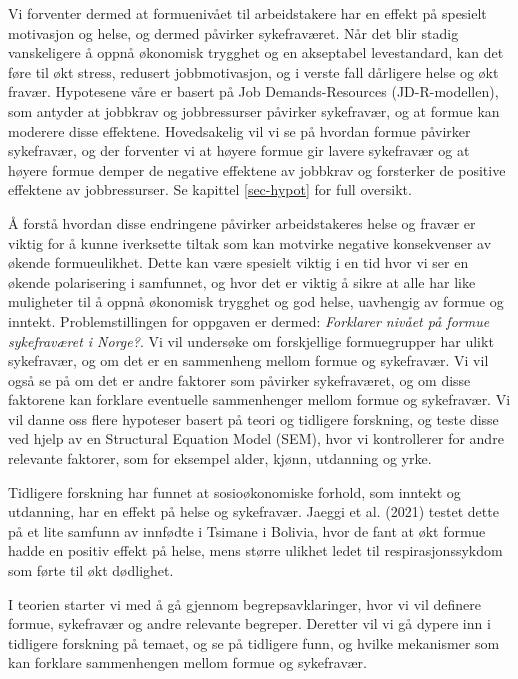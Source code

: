 \documentclass[
  12pt,
  a4paper,
  DIV=11,
  numbers=noendperiod]{scrartcl}
\begin{document}
Vi forventer dermed at formuenivået til arbeidstakere har en effekt på
spesielt motivasjon og helse, og dermed påvirker sykefraværet. Når det
blir stadig vanskeligere å oppnå økonomisk trygghet og en akseptabel
levestandard, kan det føre til økt stress, redusert jobbmotivasjon, og i
verste fall dårligere helse og økt fravær. Hypotesene våre er basert på
Job Demands-Resources (JD-R-modellen), som antyder at jobbkrav og
jobbressurser påvirker sykefravær, og at formue kan moderere disse
effektene. Hovedsakelig vil vi se på hvordan formue påvirker sykefravær,
og der forventer vi at høyere formue gir lavere sykefravær og at høyere
formue demper de negative effektene av jobbkrav og forsterker de
positive effektene av jobbressurser. Se kapittel \ref{sec-hypot} for
full oversikt.

Å forstå hvordan disse endringene påvirker arbeidstakeres helse og
fravær er viktig for å kunne iverksette tiltak som kan motvirke negative
konsekvenser av økende formueulikhet. Dette kan være spesielt viktig i
en tid hvor vi ser en økende polarisering i samfunnet, og hvor det er
viktig å sikre at alle har like muligheter til å oppnå økonomisk
trygghet og god helse, uavhengig av formue og inntekt. Problemstillingen
for oppgaven er dermed: \emph{Forklarer nivået på formue sykefraværet i
Norge?}. Vi vil undersøke om forskjellige formuegrupper har ulikt
sykefravær, og om det er en sammenheng mellom formue og sykefravær. Vi
vil også se på om det er andre faktorer som påvirker sykefraværet, og om
disse faktorene kan forklare eventuelle sammenhenger mellom formue og
sykefravær. Vi vil danne oss flere hypoteser basert på teori og
tidligere forskning, og teste disse ved hjelp av en Structural Equation
Model (SEM), hvor vi kontrollerer for andre relevante faktorer, som for
eksempel alder, kjønn, utdanning og yrke.

Tidligere forskning har funnet at sosioøkonomiske forhold, som inntekt
og utdanning, har en effekt på helse og sykefravær. Jaeggi et al. (2021)
testet dette på et lite samfunn av innfødte i Tsimane i Bolivia, hvor de
fant at økt formue hadde en positiv effekt på helse, mens større ulikhet
ledet til respirasjonssykdom som førte til økt dødlighet.

I teorien starter vi med å gå gjennom begrepsavklaringer, hvor vi vil
definere formue, sykefravær og andre relevante begreper. Deretter vil vi
gå dypere inn i tidligere forskning på temaet, og se på tidligere funn,
og hvilke mekanismer som kan forklare sammenhengen mellom formue og
sykefravær.
\end{document}
